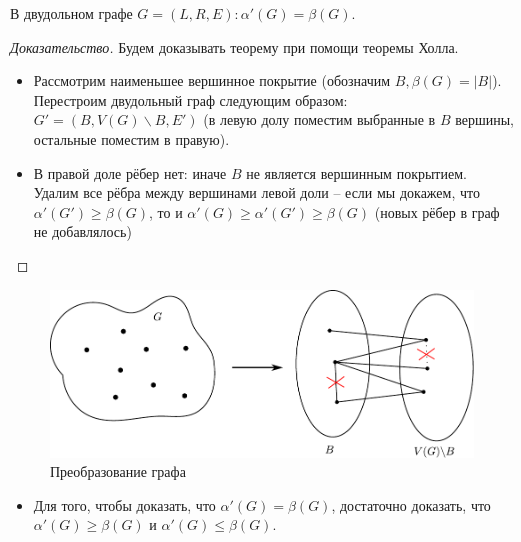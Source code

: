 \begin{frame}[t]
    \begin{theorem}[D.König, 1931]
        В двудольном графе $G = \left( L, R, E \right): \alpha'(G) = \beta(G)$.
    \end{theorem}

    \begin{proof}[Доказательство]
        \renewcommand{\qedsymbol}{}
        Будем доказывать теорему при помощи теоремы Холла.
        \begin{itemize}
            \item Рассмотрим наименьшее вершинное покрытие (обозначим $B, \beta(G) = |B|$). Перестроим двудольный граф следующим образом: $G' = \left(B, V(G) \backslash B, E'\right)$ (в левую долу поместим выбранные в $B$ вершины, остальные поместим в правую).
            \item В правой доле рёбер нет: иначе $B$ не является вершинным покрытием. Удалим все рёбра между вершинами левой доли -- если мы докажем, что $\alpha'(G') \geq \beta(G)$, то и $\alpha'(G) \geq \alpha'(G') \geq \beta(G)$ (новых рёбер в граф не добавлялось)
        \end{itemize}
          
    \end{proof}
\end{frame}

\begin{frame}[t]
    \begin{figure}[htpb]
        \centering
        \includegraphics[width=\textwidth]{images/transform}
        \footnotesize Преобразование графа
        \label{fig:transform}
    \end{figure}
    
    \begin{itemize}
        \item Для того, чтобы доказать, что $\alpha'(G) = \beta(G)$, достаточно доказать, что $\alpha'(G) \geq \beta(G)$ и $\alpha'(G) \leq \beta(G)$.
    \end{itemize}
    
\end{frame}

